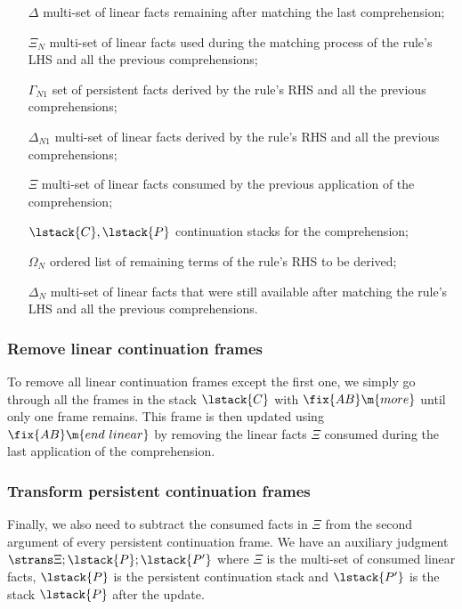 \begin{enumerate}
   \item[$\Delta$] multi-set of linear facts remaining after matching the last
   comprehension;

   \item[$\Xi_N$] multi-set of linear facts used during the matching process of
      the rule's LHS and all the previous comprehensions;

   \item[$\Gamma_{N1}$] set of persistent facts derived by the rule's RHS and
      all the previous comprehensions;

   \item[$\Delta_{N1}$] multi-set of linear facts derived by the rule's RHS and
      all the previous comprehensions;

   \item[$\Xi$] multi-set of linear facts consumed by the previous application
   of the comprehension;
   \item[$\lstack{C}, \lstack{P}$] continuation stacks for the comprehension;

   \item[$\Omega_N$] ordered list of remaining terms of the rule's RHS to be
      derived;

   \item[$\Delta_N$] multi-set of linear facts that were still available after
   matching the rule's LHS and all the previous comprehensions.

\end{enumerate}

\subsubsection{Remove linear continuation frames}

To remove all linear continuation frames except the first one, we simply go
through all the frames in the stack $\lstack{C}$ with $\fix{AB} \m{more}$
until only one frame remains. This frame is then updated using $\fix{AB} \m{end~linear}$ by removing the linear facts $\Xi$ consumed
during the last application of the comprehension.



\subsubsection{Transform persistent continuation frames}

Finally, we also need to subtract the consumed facts in $\Xi$ from the second
argument of every persistent continuation frame.  We have an auxiliary judgment
$\strans \Xi; \lstack{P}; \lstack{P'}$ where $\Xi$ is the multi-set of consumed
linear facts, $\lstack{P}$ is the persistent continuation stack and
$\lstack{P'}$ is the stack $\lstack{P}$ after the update.

